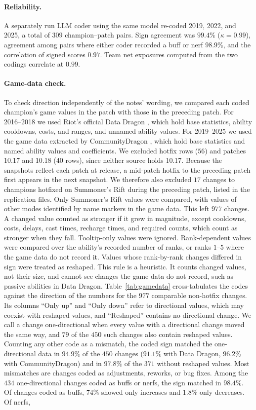 \documentclass[11pt]{article}
\begin{document}
\paragraph{Reliability.} A separately run LLM coder using the same model re-coded 2019, 2022, and 2025, a total of $309$ champion--patch pairs. Sign agreement was $99.4\%$ ($\kappa = 0.99$), agreement among pairs where either coder recorded a buff or nerf $98.9\%$, and the correlation of signed scores $0.97$. Team net exposures computed from the two codings correlate at $0.99$.

\paragraph{Game-data check.} To check direction independently of the notes' wording, we compared each coded champion's game values in the patch with those in the preceding patch. For 2016--2018 we used Riot's official Data Dragon \citep{ddragon}, which hold base statistics, ability cooldowns, costs, and ranges, and unnamed ability values. For 2019--2025 we used the game data extracted by CommunityDragon \citep{cdragon}, which hold base statistics and named ability values and coefficients. We excluded hotfix rows ($56$) and patches 10.17 and 10.18 ($40$ rows), since neither source holds 10.17. Because the snapshots reflect each patch at release, a mid-patch hotfix to the preceding patch first appears in the next snapshot. We therefore also excluded $17$ changes to champions hotfixed on Summoner's Rift during the preceding patch, listed in the replication files. Only Summoner's Rift values were compared, with values of other modes identified by name markers in the game data. This left $977$ changes. A changed value counted as stronger if it grew in magnitude, except cooldowns, costs, delays, cast times, recharge times, and required counts, which count as stronger when they fall. Tooltip-only values were ignored. Rank-dependent values were compared over the ability's recorded number of ranks, or ranks $1$--$5$ where the game data do not record it. Values whose rank-by-rank changes differed in sign were treated as reshaped. This rule is a heuristic. It counts changed values, not their size, and cannot see changes the game data do not record, such as passive abilities in Data Dragon. Table~\ref{tab:gamedata} cross-tabulates the codes against the direction of the numbers for the $977$ comparable non-hotfix changes. Its columns ``Only up'' and ``Only down'' refer to directional values, which may coexist with reshaped values, and ``Reshaped'' contains no directional change. We call a change one-directional when every value with a directional change moved the same way, and $79$ of the $450$ such changes also contain reshaped values. Counting any other code as a mismatch, the coded sign matched the one-directional data in $94.9\%$ of the $450$ changes ($91.1\%$ with Data Dragon, $96.2\%$ with CommunityDragon) and in $97.8\%$ of the $371$ without reshaped values. Most mismatches are changes coded as adjustments, reworks, or bug fixes. Among the $434$ one-directional changes coded as buffs or nerfs, the sign matched in $98.4\%$. Of changes coded as buffs, $74\%$ showed only increases and $1.8\%$ only decreases. Of nerfs, 
\end{document}
